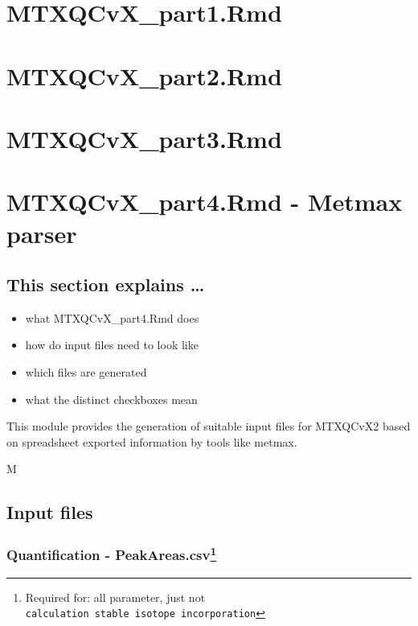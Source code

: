 \documentclass[]{book}
\providecommand{\tightlist}{%
  \setlength{\itemsep}{0pt}\setlength{\parskip}{0pt}}
\let\rmarkdownfootnote\footnote%
\def\footnote{\protect\rmarkdownfootnote}
\theoremstyle{definition}
\theoremstyle{definition}
\theoremstyle{definition}
\theoremstyle{remark}
\begin{document}
\chapter{MTXQCvX\_part1.Rmd}\label{part1}

\chapter{MTXQCvX\_part2.Rmd}\label{part2}

\chapter{MTXQCvX\_part3.Rmd}\label{mtxqcvx_part3.rmd}

\chapter{MTXQCvX\_part4.Rmd - Metmax
parser}\label{mtxqcvx_part4.rmd---metmax-parser}

\section{This section explains \ldots{}}\label{this-section-explains}

\begin{itemize}
\tightlist
\item
  what MTXQCvX\_part4.Rmd does
\item
  how do input files need to look like
\item
  which files are generated
\item
  what the distinct checkboxes mean
\end{itemize}

This module provides the generation of suitable input files for MTXQCvX2
based on spreadsheet exported information by tools like metmax.

M

\section{Input files}\label{input-files-2}

\subsection[Quantification -
PeakAreas.csv]{\texorpdfstring{Quantification - PeakAreas.csv\footnote{Required
  for: all parameter, just not
  \texttt{calculation\ stable\ isotope\ incorporation}}}{Quantification - PeakAreas.csv}}\label{quantification---peakareas.csv}
\end{document}

